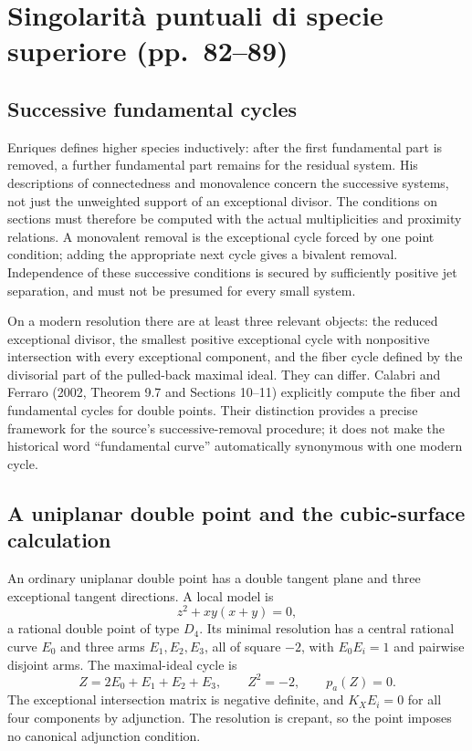 \section[Singolarità di specie superiore]{Singolarità puntuali di specie superiore (pp.~82--89)}\label{commentary-III-10}

\subsection{Successive fundamental cycles}

Enriques defines higher species inductively: after the first fundamental part is removed, a further fundamental part remains for the residual system. His descriptions of connectedness and monovalence concern the successive systems, not just the unweighted support of an exceptional divisor. The conditions on sections must therefore be computed with the actual multiplicities and proximity relations. A monovalent removal is the exceptional cycle forced by one point condition; adding the appropriate next cycle gives a bivalent removal. Independence of these successive conditions is secured by sufficiently positive jet separation, and must not be presumed for every small system.

On a modern resolution there are at least three relevant objects: the reduced exceptional divisor, the smallest positive exceptional cycle with nonpositive intersection with every exceptional component, and the fiber cycle defined by the divisorial part of the pulled-back maximal ideal. They can differ. Calabri and Ferraro (2002, Theorem 9.7 and Sections 10--11) explicitly compute the fiber and fundamental cycles for double points. Their distinction provides a precise framework for the source's successive-removal procedure; it does not make the historical word ``fundamental curve'' automatically synonymous with one modern cycle.

\subsection{A uniplanar double point and the cubic-surface calculation}

An ordinary uniplanar double point has a double tangent plane and three exceptional tangent directions. A local model is \[
z^2+xy(x+y)=0,
\] a rational double point of type \(D_4\). Its minimal resolution has a central rational curve \(E_0\) and three arms \(E_1,E_2,E_3\), all of square \(-2\), with \(E_0E_i=1\) and pairwise disjoint arms. The maximal-ideal cycle is \[
Z=2E_0+E_1+E_2+E_3,\qquad Z^2=-2,\qquad p_a(Z)=0.
\] The exceptional intersection matrix is negative definite, and \(K_XE_i=0\) for all four components by adjunction. The resolution is crepant, so the point imposes no canonical adjunction condition.

